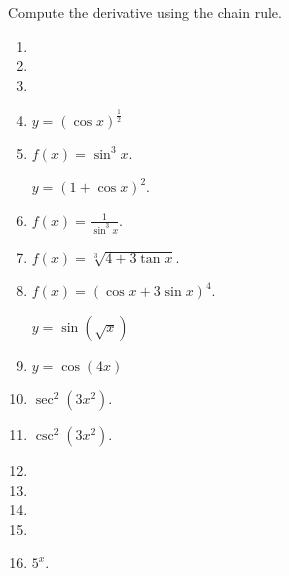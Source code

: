 Compute the derivative using the chain rule.
\begin{multicols}{2}
\begin{enumerate}[ref={\fcProblemRef}]
\item 
\item 

\item 
\item 
{} \label{problemd/dx((cosx)^(1/2))} $y = (\cos x)^{\frac{1}{2}}$


\item $\displaystyle f(x)=\sin^3 x$.

 \label{problemd/dx((1+cosx)^2)}  $y = (1+\cos x)^2$.


\item   $\displaystyle f(x)=\frac{1}{\sin^3x}$.

\item  $\displaystyle f(x)= \sqrt[3]{4+3\tan x}$.

\item  $f(x)=(\cos x + 3\sin x)^4$.


 \label{problemd/dx(sin(sqrt(x)))}  $\displaystyle y = \sin \left( \sqrt{x}\right)$

\item  $y = \cos\left( 4x\right)$


\item $\sec^2 (3x^2)$. 


\item $\csc^2 (3x^2)$. 

\item 
\item 
\item 
\item 
\item $5^{x}$.


\end{enumerate}
\end{multicols}
